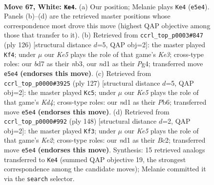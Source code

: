 \documentclass[11pt]{article}
\begin{document}
\clearpage

\begin{figure}[p]\centering
\begin{subfigure}{0.46\textwidth}\centering
\resizebox{\linewidth}{!}{%
\newchessgame
\chessboard[
  setfen={8/k2b4/8/P3K3/1P6/8/8/3n4 w - - 0 67},
  showmover=false,
  pgfstyle=straightmove, color=movearrow, markmove={e5-e4}
]}
\caption{}
\end{subfigure}\hfill
\begin{subfigure}{0.46\textwidth}\centering
\resizebox{\linewidth}{!}{%
\newchessgame
\chessboard[
  setfen={8/6k1/8/6P1/6PP/1n2K3/8/8 w - - 1 64},
  showmover=false,
  pgfstyle=straightmove, color=movearrow, markmove={e3-f4}
]}
\caption{}
\end{subfigure}
\\[4pt]
\begin{subfigure}{0.46\textwidth}\centering
\resizebox{\linewidth}{!}{%
\newchessgame
\chessboard[
  setfen={8/5B2/1p6/3k2p1/7p/8/6K1/8 b - - 3 64},
  showmover=false,
  pgfstyle=straightmove, color=movearrow, markmove={d5-c5}
]}
\caption{}
\end{subfigure}\hfill
\begin{subfigure}{0.46\textwidth}\centering
\resizebox{\linewidth}{!}{%
\newchessgame
\chessboard[
  setfen={6k1/8/7P/2b3P1/8/8/2B1K3/8 w - - 1 75},
  showmover=false,
  pgfstyle=straightmove, color=movearrow, markmove={e2-f3}
]}
\caption{}
\end{subfigure}
\caption{\textbf{Move 67, White: \texttt{Ke4}.} (a) Our position; Melanie plays \texttt{Ke4} (\texttt{e5e4}). Panels (b)--(d) are the retrieved master positions whose correspondence most drove this move (highest QAP objective among those that transfer to it). (b) Retrieved from \texttt{ccrl\_top\_p0003\#847} (ply 126) [structural distance $d$=5, QAP obj=2]: the master played \texttt{Kf4}; under $\mu$ our \emph{Ke5} plays the role of that game's \emph{Ke3}; cross-type roles: our \emph{b}d7 as their \emph{n}b3, our \emph{n}d1 as their \emph{P}g4; transferred move \texttt{e5e4} \textbf{(endorses this move)}. (c) Retrieved from \texttt{ccrl\_top\_p0000\#3925} (ply 127) [structural distance $d$=5, QAP obj=2]: the master played \texttt{Kc5}; under $\mu$ our \emph{Ke5} plays the role of that game's \emph{Kd4}; cross-type roles: our \emph{n}d1 as their \emph{P}b6; transferred move \texttt{e5e4} \textbf{(endorses this move)}. (d) Retrieved from \texttt{ccrl\_top\_p0000\#992} (ply 148) [structural distance $d$=2, QAP obj=2]: the master played \texttt{Kf3}; under $\mu$ our \emph{Ke5} plays the role of that game's \emph{Ke2}; cross-type roles: our \emph{n}d1 as their \emph{B}c2; transferred move \texttt{e5e4} \textbf{(endorses this move)}. Synthesis: 15 retrieved analogs transferred to \texttt{Ke4} (summed QAP objective 19, the strongest correspondence among the candidate moves); Melanie committed it via the \texttt{search} selector.}
\label{fig:thought-m132}
\end{figure}
\end{document}
